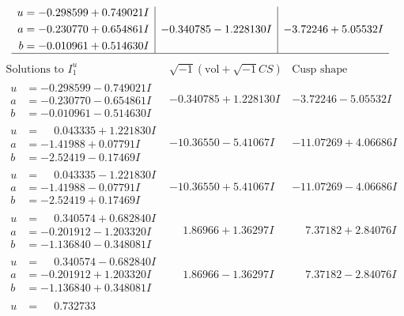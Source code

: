 \documentclass[1p]{elsarticle_modified}
\theoremstyle{definition}
\newcommand{\I}{\sqrt{-1}}
\begin{document}
$$\begin{array}{c|c|c}
\begin{aligned}
u &= -0.298599 + 0.749021 I \\
a &= -0.230770 + 0.654861 I \\
b &= -0.010961 + 0.514630 I\end{aligned}
 & -0.340785 - 1.228130 I & -3.72246 + 5.05532 I\\
 \hline 
 \end{array}$$\newpage$$\begin{array}{c|c|c}  
\text{Solutions to }I^u_{1}& \I (\text{vol} + \sqrt{-1}CS) & \text{Cusp shape}\\
 \hline 
\begin{aligned}
u &= -0.298599 - 0.749021 I \\
a &= -0.230770 - 0.654861 I \\
b &= -0.010961 - 0.514630 I\end{aligned}
 & -0.340785 + 1.228130 I & -3.72246 - 5.05532 I \\ \hline\begin{aligned}
u &= \phantom{-}0.043335 + 1.221830 I \\
a &= -1.41988 + 0.07791 I \\
b &= -2.52419 - 0.17469 I\end{aligned}
 & -10.36550 - 5.41067 I & -11.07269 + 4.06686 I \\ \hline\begin{aligned}
u &= \phantom{-}0.043335 - 1.221830 I \\
a &= -1.41988 - 0.07791 I \\
b &= -2.52419 + 0.17469 I\end{aligned}
 & -10.36550 + 5.41067 I & -11.07269 - 4.06686 I \\ \hline\begin{aligned}
u &= \phantom{-}0.340574 + 0.682840 I \\
a &= -0.201912 - 1.203320 I \\
b &= -1.136840 - 0.348081 I\end{aligned}
 & \phantom{-}1.86966 + 1.36297 I & \phantom{-}7.37182 + 2.84076 I \\ \hline\begin{aligned}
u &= \phantom{-}0.340574 - 0.682840 I \\
a &= -0.201912 + 1.203320 I \\
b &= -1.136840 + 0.348081 I\end{aligned}
 & \phantom{-}1.86966 - 1.36297 I & \phantom{-}7.37182 - 2.84076 I \\ \hline\begin{aligned}
u &= \phantom{-}0.732733\phantom{ +0.000000I} \\

\end{aligned}
\end{array}$$
\end{document}
